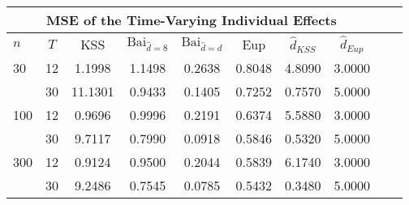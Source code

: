 \begin{tabular}{lccccccccc} 
\hline \multicolumn{8}{c}{MSE of the Time-Varying Individual Effects} \\ \hline 
$n$ & $T$ & KSS & $ \text{Bai}_{\hat{d} = 8}$ & $\text{Bai}_{\hat{d} = d}$ & Eup & $\hat{d}_{KSS}$ & $\hat{d}_{Eup}$ \\
\hline
30 & 12 &  1.1998  &  1.1498  &  0.2638  &  0.8048  &  4.8090  &  3.0000  \\
& 30 &  11.1301  &  0.9433  &  0.1405  &  0.7252  &  0.7570  &  5.0000  \\
100 & 12 &  0.9696  &  0.9996  &  0.2191  &  0.6374  &  5.5880  &  3.0000  \\
& 30 &  9.7117  &  0.7990  &  0.0918  &  0.5846  &  0.5320  &  5.0000  \\
300 & 12 &  0.9124  &  0.9500  &  0.2044  &  0.5839  &  6.1740  &  3.0000  \\
& 30 &  9.2486  &  0.7545  &  0.0785  &  0.5432  &  0.3480  &  5.0000  \\
\end{tabular} 
